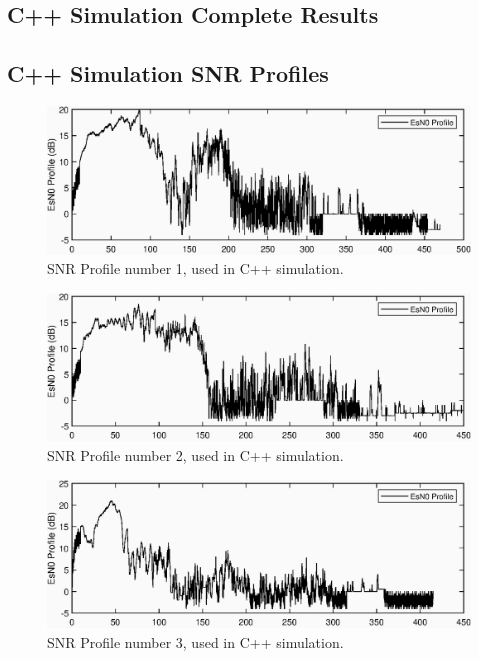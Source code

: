 
\begin{appendices}
\chapter{C++ Simulation Complete Results}
\section{C++ Simulation SNR Profiles}\label{app:cSNRProfiles_all}
\begin{figure}[ht!]
\includegraphics{figures/c_sim_snr/EsNo_profile_1.eps}
\caption{SNR Profile number 1, used in C++ simulation.}
\end{figure}
\begin{figure}[ht!]
\includegraphics{figures/c_sim_snr/EsNo_profile_2.eps}
\caption{SNR Profile number 2, used in C++ simulation.}
\end{figure}
\begin{figure}[ht!]
\includegraphics{figures/c_sim_snr/EsNo_profile_3.eps}
\caption{SNR Profile number 3, used in C++ simulation.}
\end{figure}

\end{appendices}
